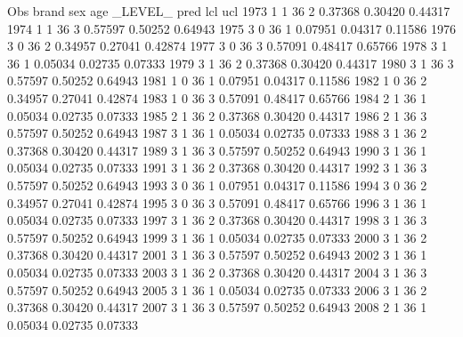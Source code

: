 \documentclass{article}
\begin{document}
\begin{Woutput}
 Obs    brand    sex    age    _LEVEL_      pred       lcl        ucl
1973      1       1      36       2       0.37368    0.30420    0.44317
1974      1       1      36       3       0.57597    0.50252    0.64943
1975      3       0      36       1       0.07951    0.04317    0.11586
1976      3       0      36       2       0.34957    0.27041    0.42874
1977      3       0      36       3       0.57091    0.48417    0.65766
1978      3       1      36       1       0.05034    0.02735    0.07333
1979      3       1      36       2       0.37368    0.30420    0.44317
1980      3       1      36       3       0.57597    0.50252    0.64943
1981      1       0      36       1       0.07951    0.04317    0.11586
1982      1       0      36       2       0.34957    0.27041    0.42874
1983      1       0      36       3       0.57091    0.48417    0.65766
1984      2       1      36       1       0.05034    0.02735    0.07333
1985      2       1      36       2       0.37368    0.30420    0.44317
1986      2       1      36       3       0.57597    0.50252    0.64943
1987      3       1      36       1       0.05034    0.02735    0.07333
1988      3       1      36       2       0.37368    0.30420    0.44317
1989      3       1      36       3       0.57597    0.50252    0.64943
1990      3       1      36       1       0.05034    0.02735    0.07333
1991      3       1      36       2       0.37368    0.30420    0.44317
1992      3       1      36       3       0.57597    0.50252    0.64943
1993      3       0      36       1       0.07951    0.04317    0.11586
1994      3       0      36       2       0.34957    0.27041    0.42874
1995      3       0      36       3       0.57091    0.48417    0.65766
1996      3       1      36       1       0.05034    0.02735    0.07333
1997      3       1      36       2       0.37368    0.30420    0.44317
1998      3       1      36       3       0.57597    0.50252    0.64943
1999      3       1      36       1       0.05034    0.02735    0.07333
2000      3       1      36       2       0.37368    0.30420    0.44317
2001      3       1      36       3       0.57597    0.50252    0.64943
2002      3       1      36       1       0.05034    0.02735    0.07333
2003      3       1      36       2       0.37368    0.30420    0.44317
2004      3       1      36       3       0.57597    0.50252    0.64943
2005      3       1      36       1       0.05034    0.02735    0.07333
2006      3       1      36       2       0.37368    0.30420    0.44317
2007      3       1      36       3       0.57597    0.50252    0.64943
2008      2       1      36       1       0.05034    0.02735    0.07333

\end{Woutput}
\end{document}
